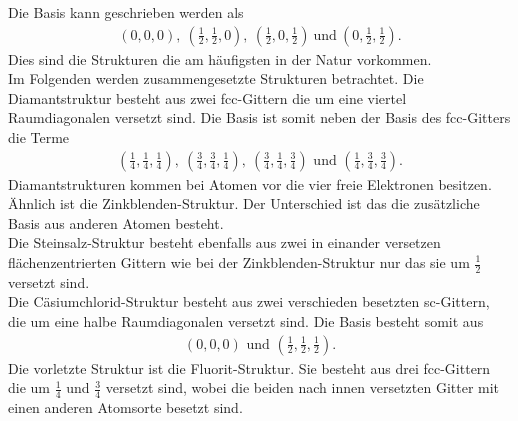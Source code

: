 Die Basis kann geschrieben werden als
\begin{align}
	\left( 0, 0, 0\right),\ \left( \frac{1}{2},\frac{1}{2},0\right),\ \left(\frac{1}{2}, 0 , \frac{1}{2}\right)\ \text{und}\ \left(0,\frac{1}{2},\frac{1}{2}\right).
\end{align}
Dies sind die Strukturen die am häufigsten in der Natur vorkommen.\\
Im Folgenden werden zusammengesetzte Strukturen betrachtet.
Die Diamantstruktur besteht aus zwei fcc-Gittern die um eine viertel Raumdiagonalen versetzt sind. Die Basis ist somit neben der Basis des fcc-Gitters die Terme
\begin{align}
 \left(\frac{1}{4},\frac{1}{4},\frac{1}{4}\right),\ \left(\frac{3}{4},\frac{3}{4},\frac{1}{4}\right),\ \left(\frac{3}{4},\frac{1}{4},\frac{3}{4}\right)\text{ und } \left(\frac{1}{4},\frac{3}{4},\frac{3}{4}\right).
\end{align}
Diamantstrukturen kommen bei Atomen vor die vier freie Elektronen besitzen.\\
Ähnlich ist die Zinkblenden-Struktur. Der Unterschied ist das die zusätzliche Basis aus anderen Atomen besteht.\\
Die Steinsalz-Struktur besteht ebenfalls aus zwei in einander versetzen flächenzentrierten Gittern wie bei der Zinkblenden-Struktur nur das sie um $\frac{1}{2}$ versetzt sind.\\
Die Cäsiumchlorid-Struktur besteht aus zwei verschieden besetzten sc-Gittern, die um eine halbe Raumdiagonalen versetzt sind. Die Basis besteht somit aus 
\begin{align}
	\left(0,0,0\right)\text{ und }\left(\frac{1}{2},\frac{1}{2},\frac{1}{2}\right).
\end{align}
Die vorletzte Struktur ist die Fluorit-Struktur. Sie besteht aus drei fcc-Gittern die um $\frac{1}{4}$ und $\frac{3}{4}$ versetzt sind, wobei die beiden nach innen versetzten Gitter mit einen 
anderen Atomsorte besetzt sind.\\
